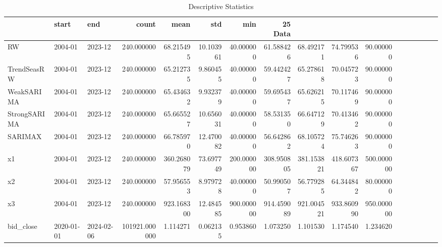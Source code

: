 \begin{table}
\caption{Descriptive Statistics}
\begin{tabular}{lllrrrrrrrr}
\toprule
 & start & end & count & mean & std & min & 25%
Data &  &  &  &  &  &  &  &  &  &  \\
\midrule
RW & 2004-01 & 2023-12 & 240.000000 & 68.215495 & 10.103961 & 40.000000 & 61.588426 & 68.492171 & 74.799536 & 90.000000 \\
TrendSeasRW & 2004-01 & 2023-12 & 240.000000 & 65.212735 & 9.860455 & 40.000000 & 59.442427 & 65.278618 & 70.045723 & 90.000000 \\
WeakSARIMA & 2004-01 & 2023-12 & 240.000000 & 65.434632 & 9.932379 & 40.000000 & 59.695437 & 65.626215 & 70.117469 & 90.000000 \\
StrongSARIMA & 2004-01 & 2023-12 & 240.000000 & 65.665527 & 10.656031 & 40.000000 & 58.531350 & 66.647129 & 70.413462 & 90.000000 \\
SARIMAX & 2004-01 & 2023-12 & 240.000000 & 66.785970 & 12.470082 & 40.000000 & 56.642862 & 68.105724 & 75.746263 & 90.000000 \\
x1 & 2004-01 & 2023-12 & 240.000000 & 360.268079 & 73.697749 & 200.000000 & 308.950805 & 381.153821 & 418.607367 & 500.000000 \\
x2 & 2004-01 & 2023-12 & 240.000000 & 57.956553 & 8.979728 & 40.000000 & 50.990507 & 56.779285 & 64.344842 & 80.000000 \\
x3 & 2004-01 & 2023-12 & 240.000000 & 923.168300 & 12.484585 & 900.000000 & 914.459089 & 921.004521 & 933.860990 & 950.000000 \\
bid_close & 2020-01-01 & 2024-02-06 & 101921.000000 & 1.114271 & 0.062135 & 0.953860 & 1.073250 & 1.101530 & 1.174540 & 1.234620 \\
\bottomrule
\end{tabular}
\end{table}

